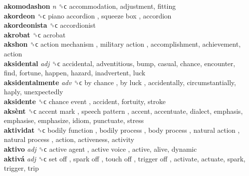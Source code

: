 \textbf{akomodashon} \emph{n}  ␝ϲ  accommodation, adjustment, fitting  \\
\textbf{akordeon} ␝ϲ   piano accordion ,  squeeze box , accordion  \\
\textbf{akordeonista} ␝ϲ  accordionist  \\
\textbf{akrobat} ␝ϲ  acrobat  \\
\textbf{akshon} ␝ϲ   action mechanism ,  military action , accomplishment, achievement, action  \\
\textbf{aksidental} \emph{adj}  ␝ϲ  accidental, adventitious, bump, casual, chance, encounter, find, fortune, happen, hazard, inadvertent, luck  \\
\textbf{aksidentalmente} \emph{adv}  ␝ϲ   by chance ,  by luck , accidentally, circumstantially, haply, unexpectedly  \\
\textbf{aksidente} ␝ϲ   chance event , accident, fortuity, stroke  \\
\textbf{aksènt} ␝ϲ   accent mark ,  speech pattern , accent, accentuate, dialect, emphasis, emphasise, emphasize, idiom, punctuate, stress  \\
\textbf{aktividat} ␝ϲ   bodily function ,  bodily process ,  body process ,  natural action ,  natural process , action, activeness, activity  \\
\textbf{aktivo} \emph{adj}  ␝ϲ   active agent ,  active voice , active, alive, dynamic  \\
\textbf{aktivá} \emph{adj}  ␝ϲ   set off ,  spark off ,  touch off ,  trigger off , activate, actuate, spark, trigger, trip  \\
